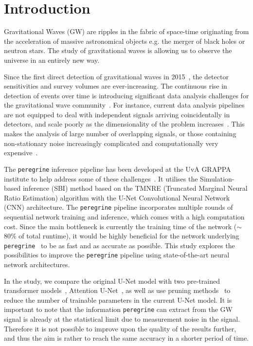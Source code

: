 \section{Introduction}
\label{sec:introduction}

Gravitational Waves (GW) are ripples in the fabric of space-time originating from the acceleration of massive astronomical objects e.g. the merger of black holes or neutron stars. The study of gravitational waves is allowing us to observe the universe in an entirely new way.

Since the first direct detection of gravitational waves in 2015~\cite{LIGO_2016}, the detector sensitivities and survey volumes are ever-increasing. The continuous rise in detection of events over time is introducing significant data analysis challenges for the gravitational wave community~\cite{bhardwaj2023peregrine}.
For instance, current data analysis pipelines are not equipped to deal with independent signals arriving coincidentally in detectors, and scale poorly as the dimensionality of the problem increases~\cite{alvey2023things}. This makes the analysis of large number of overlapping signals, or those containing non-stationary noise increasingly complicated and computationally very expensive~\cite{bhardwaj2023peregrine}.

The \texttt{peregrine} inference pipeline has been developed at the UvA GRAPPA institute to help address some of these challenges~\cite{bhardwaj2023peregrine}. It utilises the Simulation-based inference (SBI) method based on the TMNRE (Truncated Marginal Neural Ratio Estimation) algorithm with the U-Net Convolutional Neural Network (CNN) architecture. The \texttt{peregrine} pipeline incorporates multiple rounds of sequential network training and inference, which comes with a high computation cost. Since the main bottleneck is currently the training time of the network ($\sim$80\% of total runtime), it would be highly beneficial for the network underlying \texttt{peregrine}~\cite{bhardwaj2023peregrine} to be as fast and as accurate as possible. This study explores the possibilities to improve the \texttt{peregrine} pipeline using state-of-the-art neural network architectures.

In the study, we compare the original U-Net model with two pre-trained transformer models~\cite{Dosovitskiy_2021_ViT,Zerveas_2020_mvts}, Attention U-Net~\cite{Oktay_2018_AUNet}, as well as use pruning methods~\cite{Fang_Ma_Song_Mi_Wang_2023} to reduce the number of trainable parameters in the current U-Net model. It is important to note that the information \texttt{peregrine} can extract from the GW signal is already at the statistical limit due to measurement noise in the signal. Therefore it is not possible to improve upon the quality of the results further, and thus the aim is rather to reach the same accuracy in a shorter period of time.

